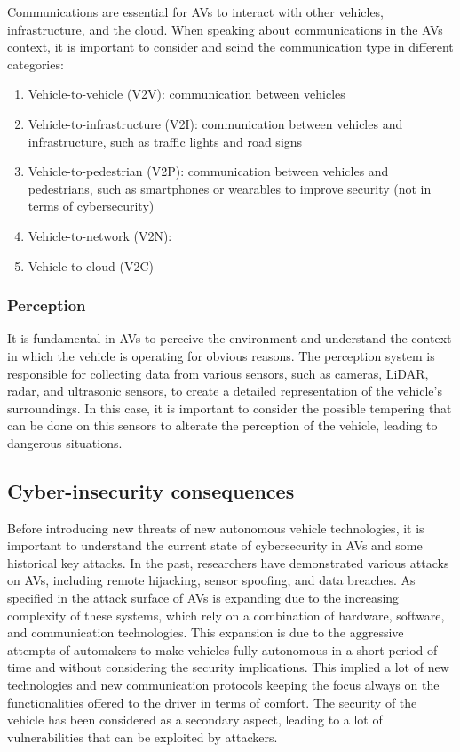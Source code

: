 Communications are essential for AVs to interact with other vehicles, infrastructure, and the cloud.
When speaking about communications in the AVs context, it is important to consider and scind the communication type in different categories:
\begin{enumerate}
    \item Vehicle-to-vehicle (V2V): communication between vehicles
    \item Vehicle-to-infrastructure (V2I): communication between vehicles and infrastructure, such as traffic lights and road signs
    \item Vehicle-to-pedestrian (V2P): communication between vehicles and pedestrians, such as smartphones or wearables to improve security (not in terms of cybersecurity)
    \item Vehicle-to-network (V2N):
    \item Vehicle-to-cloud (V2C)
\end{enumerate}


\subsubsection{Perception}\label{subsubsec:perception}
It is fundamental in AVs to perceive the environment and understand the context in which the vehicle is operating for obvious reasons.
The perception system is responsible for collecting data from various sensors, such as cameras, LiDAR, radar, and ultrasonic sensors, to create a detailed representation of the vehicle's surroundings.
In this case, it is important to consider the possible tempering that can be done on this sensors to alterate the perception of the vehicle, leading to dangerous situations.

\subsection{Cyber-insecurity consequences}\label{subsec:cyber-insecurity}

Before introducing new threats of new autonomous vehicle technologies, it is important to understand the current state of cybersecurity in AVs and some historical key attacks.
In the past, researchers have demonstrated various attacks on AVs, including remote hijacking, sensor spoofing, and data breaches.
As specified in \cite{cybersec} the attack surface of AVs is expanding due to the increasing complexity of these systems, which rely on a combination of hardware, software, and communication technologies.
This expansion is due to the aggressive attempts of automakers to
make vehicles fully autonomous in a short period of time and without considering the security implications.
This implied a lot of new technologies and new communication protocols keeping the focus always on the functionalities offered to the driver in terms of comfort.
The security of the vehicle has been considered as a secondary aspect, leading to a lot of vulnerabilities that can be exploited by attackers.

